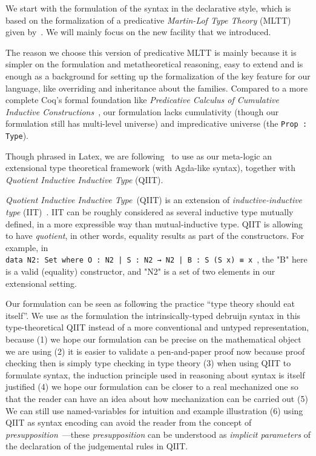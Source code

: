 We start with the formulation of the syntax in the declarative style, which is based on the
formalization of a predicative \textit{Martin-Lof Type Theory} (MLTT)~\cite{martin1982constructive}
given by~\citet{coquand2018canonicity}. We will mainly focus on the new facility that we introduced. 

The reason we choose this version of predicative MLTT is mainly because it is simpler on the formulation and metatheoretical reasoning, easy to extend and is enough as a background for setting up the formalization of the key feature for our language, like overriding and inheritance about the families. Compared to a more complete Coq's formal foundation like \textit{Predicative Calculus of Cumulative Inductive Constructions}~\cite{timany2018cumulative}, our formulation lacks cumulativity (though our formulation still has multi-level universe) and impredicative universe (the \texttt{Prop : Type}). 


Though phrased in Latex, we are following~\citet{altkap2016} to use as
our meta-logic an extensional type theoretical framework (with Agda-like syntax), 
together with \textit{Quotient Inductive Inductive Type} (QIIT). 

\textit{Quotient Inductive Inductive Type}~(QIIT) is an extension of \textit{inductive-inductive type} (IIT)~\cite{nordvall2010inductive}. IIT can be roughly considered as several inductive type mutually defined, in a more expressible way than mutual-inductive type. QIIT is allowing to have \textit{quotient}, in other words, equality results as part of the constructors. For example, in \\ \texttt{data N2: Set where O : N2 | S : N2 → N2 | B : S (S x) ≡ x }, the "B" here is a valid (equality) constructor, and "N2" is a set of two elements in our extensional setting.

Our formulation can be seen as following the practice ``type theory should eat itself''\cite{dybjer1995internal, chapman2009type}. We use as the formulation the intrinsically-typed debruijn syntax in this type-theoretical QIIT instead of a more conventional and untyped representation, because (1) we hope our formulation can be precise on the mathematical object we are using (2) it is easier to validate a pen-and-paper proof now because proof checking then is simply type checking in type theory (3) when using QIIT to formulate syntax, the induction principle used in reasoning about syntax is itself justified (4) we hope our formulation can be closer to a real mechanized one so that the reader can have an idea about how mechanization can be carried out (5) We can still use named-variables for intuition and example illustration (6) using QIIT as syntax encoding can avoid the reader from the concept of \textit{presupposition}~\cite{gratzer-sterling-birkedal-2019}---these \textit{presupposition} can be understood as \textit{implicit parameters} of the declaration of the judgemental rules in QIIT.

